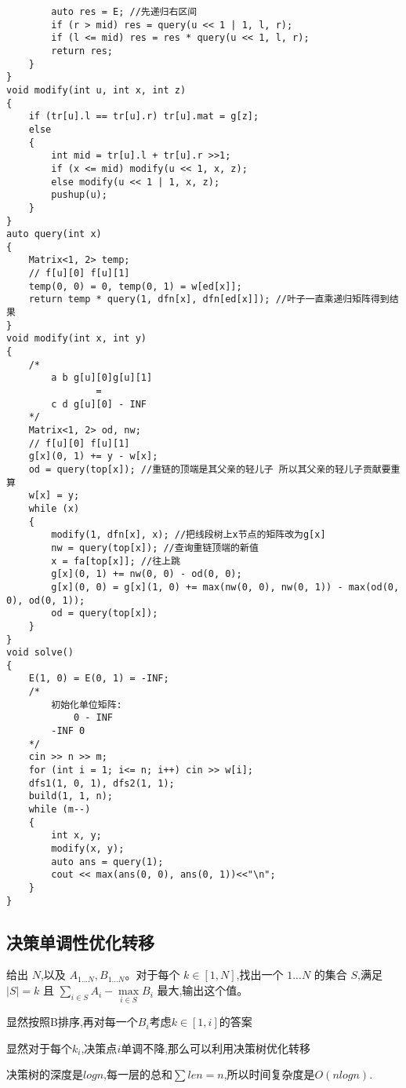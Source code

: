 \documentclass[a4paper, fontset=none]{ctexart}
\begin{document}
\begin{verbatim}
        auto res = E; //先递归右区间
        if (r > mid) res = query(u << 1 | 1, l, r);
        if (l <= mid) res = res * query(u << 1, l, r);
        return res;
    }
}
void modify(int u, int x, int z)
{
    if (tr[u].l == tr[u].r) tr[u].mat = g[z];
    else
    {
        int mid = tr[u].l + tr[u].r >>1;
        if (x <= mid) modify(u << 1, x, z);
        else modify(u << 1 | 1, x, z);
        pushup(u);
    }
}
auto query(int x)
{
    Matrix<1, 2> temp;
    // f[u][0] f[u][1]
    temp(0, 0) = 0, temp(0, 1) = w[ed[x]];
    return temp * query(1, dfn[x], dfn[ed[x]]); //叶子一直乘递归矩阵得到结果
}
void modify(int x, int y)
{
    /*
        a b g[u][0]g[u][1]
                =
        c d g[u][0] - INF
    */
    Matrix<1, 2> od, nw;
    // f[u][0] f[u][1]
    g[x](0, 1) += y - w[x];
    od = query(top[x]); //重链的顶端是其父亲的轻儿子 所以其父亲的轻儿子贡献要重算
    w[x] = y;
    while (x)
    {
        modify(1, dfn[x], x); //把线段树上x节点的矩阵改为g[x]
        nw = query(top[x]); //查询重链顶端的新值
        x = fa[top[x]]; //往上跳
        g[x](0, 1) += nw(0, 0) - od(0, 0);
        g[x](0, 0) = g[x](1, 0) += max(nw(0, 0), nw(0, 1)) - max(od(0, 0), od(0, 1));
        od = query(top[x]);
    }
}
void solve()
{
    E(1, 0) = E(0, 1) = -INF;
    /*
        初始化单位矩阵:
            0 - INF
        -INF 0
    */
    cin >> n >> m;
    for (int i = 1; i<= n; i++) cin >> w[i];
    dfs1(1, 0, 1), dfs2(1, 1);
    build(1, 1, n);
    while (m--)
    {
        int x, y;
        modify(x, y);
        auto ans = query(1);
        cout << max(ans(0, 0), ans(0, 1))<<"\n";
    }
}
\end{verbatim}
\subsection{决策单调性优化转移}

给出 $N$,以及 $A_{1...N}, B_{1...N}$。对于每个 $k\in [1, N]$,找出一个 $1...N$ 的集合 $S$,满足 $|S |= k$ 且 $\sum\limits_{i\in S}A_i-\max\limits_{i\in S}B_i$ 最大,输出这个值。

显然按照B排序,再对每一个$B_i$考虑$k\in [1, i]$的答案

显然对于每个$k_i$,决策点$i$单调不降,那么可以利用决策树优化转移

决策树的深度是$logn$,每一层的总和$\sum len=n$,所以时间复杂度是$O(nlogn)$.
\end{document}
